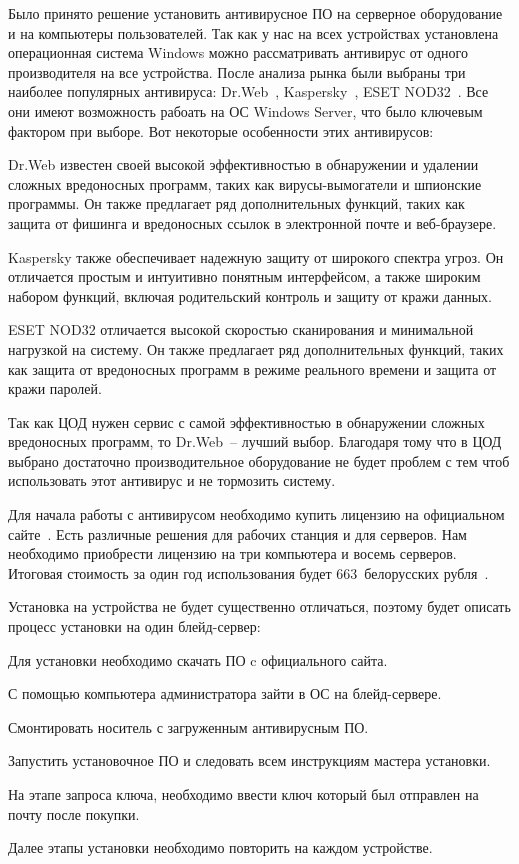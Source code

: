 Было принято решение установить антивирусное ПО на серверное оборудование и на компьютеры пользователей. Так как у нас на всех устройствах установлена операционная система Windows можно рассматривать антивирус от одного производителя на все устройства. После анализа рынка были выбраны три наиболее популярных антивируса: Dr.Web~\cite{drweb}, Kaspersky~\cite{kaspersky}, ESET NOD32~\cite{esetnod32}. Все они имеют возможность рабоать на ОС Windows Server, что было ключевым фактором при выборе. Вот некоторые особенности этих антивирусов:
\begin{enumerate_num}
    \item Dr.Web известен своей высокой эффективностью в обнаружении и удалении сложных вредоносных программ, таких как вирусы-вымогатели и шпионские программы. Он также предлагает ряд дополнительных функций, таких как защита от фишинга и вредоносных ссылок в электронной почте и веб-браузере.
    \item Kaspersky также обеспечивает надежную защиту от широкого спектра угроз. Он отличается простым и интуитивно понятным интерфейсом, а также широким набором функций, включая родительский контроль и защиту от кражи данных.
    \item ESET NOD32 отличается высокой скоростью сканирования и минимальной нагрузкой на систему. Он также предлагает ряд дополнительных функций, таких как защита от вредоносных программ в режиме реального времени и защита от кражи паролей.
\end{enumerate_num}

Так как ЦОД нужен сервис с самой эффективностью в обнаружении сложных вредоносных программ, то Dr.Web~-- лучший выбор. Благодаря тому что в ЦОД выбрано достаточно производительное оборудование не будет проблем с тем чтоб использовать этот антивирус и не тормозить систему.

Для начала работы с антивирусом необходимо купить лицензию на официальном сайте~\cite{products_drweb}. Есть различные решения для рабочих станция и для серверов. Нам необходимо приобрести лицензию на три компьютера и восемь серверов. Итоговая стоимость за один год использования будет 663~белорусских рубля~\cite{products_drweb}.

Установка на устройства не будет существенно отличаться, поэтому будет описать процесс установки на один блейд-сервер:
\begin{enumerate_num}
    \item Для установки необходимо скачать ПО c официального сайта.
    \item С помощью компьютера администратора зайти в ОС на блейд-сервере.
    \item Смонтировать носитель с загруженным антивирусным ПО.
    \item Запустить установочное ПО и следовать всем инструкциям мастера установки.
    \item На этапе запроса ключа, необходимо ввести ключ который был отправлен на почту после покупки.
\end{enumerate_num}

Далее этапы установки необходимо повторить на каждом устройстве.
